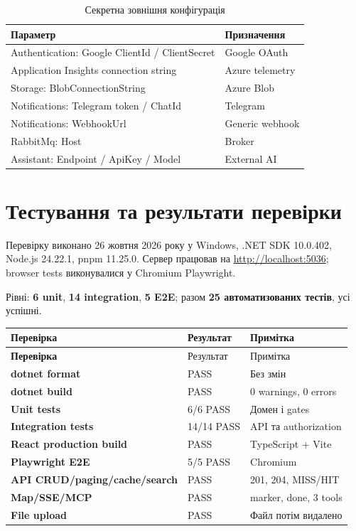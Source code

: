 \documentclass[12pt,a4paper]{article}
\begin{document}
\begin{table}[H]\centering\small
\begin{tabularx}{\textwidth}{p{} X}
\toprule Параметр & Призначення \\
\midrule
Authentication: Google ClientId / ClientSecret & Google OAuth \\
Application Insights connection string & Azure telemetry \\
Storage: BlobConnectionString & Azure Blob \\
Notifications: Telegram token / ChatId & Telegram \\
Notifications: WebhookUrl & Generic webhook \\
RabbitMq: Host & Broker \\
Assistant: Endpoint / ApiKey / Model & External AI \\
\bottomrule\end{tabularx}\caption{Секретна зовнішня конфігурація}\end{table}

\section{Тестування та результати перевірки}
Перевірку виконано 26 жовтня 2026 року у Windows, .NET SDK 10.0.402,
Node.js 24.22.1, pnpm 11.25.0. Сервер працював на
\url{http://localhost:5036}; browser tests виконувалися у Chromium Playwright.

Рівні: \textbf{6 unit}, \textbf{14 integration}, \textbf{5 E2E}; разом
\textbf{25 автоматизованих тестів}, усі успішні.

\begin{longtable}{>{\bfseries}p{} p{} p{}}
\toprule Перевірка & Результат & Примітка \\
\midrule\endfirsthead
\toprule Перевірка & Результат & Примітка \\
\midrule\endhead
dotnet format & PASS & Без змін \\
dotnet build & PASS & 0 warnings, 0 errors \\
Unit tests & 6/6 PASS & Домен і gates \\
Integration tests & 14/14 PASS & API та authorization \\
React production build & PASS & TypeScript + Vite \\
Playwright E2E & 5/5 PASS & Chromium \\
API CRUD/paging/cache/search & PASS & 201, 204, MISS/HIT \\
Map/SSE/MCP & PASS & marker, done, 3 tools \\
File upload & PASS & Файл потім видалено \\
\bottomrule\end{longtable}
\end{document}
